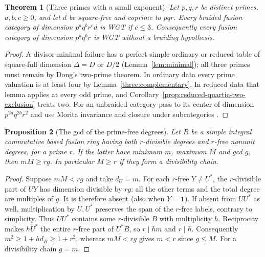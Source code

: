 \documentclass[11pt,a4paper]{article}
\numberwithin{equation}{section}
\newtheorem{theorem}{Theorem}[section]
\newtheorem{proposition}[theorem]{Proposition}
\theoremstyle{remark}
\newcommand{\one}{\mathbf1}
\begin{document}
\begin{theorem}[Three primes with a small exponent]\label{fam:M:4.12}
\label{thm:three}\label{thm:three-odd-cube-general}
Let $p,q,r$ be distinct primes, $a,b,c\ge0$, and let $d$ be
square-free and coprime to $pqr$. Every braided fusion category of
dimension $p^a q^b r^c d$ is WGT if $c\le3$. Consequently every fusion category of dimension
$p^a q^b r$ is WGT without a braiding hypothesis.
\end{theorem}
\begin{proof}
A divisor-minimal failure has a perfect simple ordinary or reduced
table of square-full dimension $\Delta=D$ or $D/2$
(Lemma~\ref{lem:minimal}); all three primes must remain by Dong's
two-prime theorem. In ordinary data every prime valuation is at least four by
Lemma~\ref{three:complementary}. In reduced data that lemma
applies at every odd prime, and Corollary~\ref{prop:reduced-quartic-two-exclusion}
treats two.
For an unbraided category pass to its center of dimension
$p^{2a}q^{2b}r^2$ and use Morita invariance and closure under
subcategories \cite[Proposition~4.1]{ENOsolvable}.
\end{proof}

\begin{proposition}[The gcd of the prime-free degrees]\label{fam:M:4.13}\label{prop:prime-free-gcd}\label{new:leak}
Let $R$ be a simple integral commutative based fusion ring having
both $r$-divisible degrees and $r$-free nonunit degrees, for a prime
$r$. If the latter have minimum $m$, maximum $M$ and gcd $g$, then
$mM\ge rg$. In particular $M\ge r$ if they form a divisibility chain.
\end{proposition}
\begin{proof}
Suppose $mM<rg$ and take $d_U=m$. For each $r$-free $Y\ne U^*$,
the $r$-divisible part of $UY$ has dimension divisible by $rg$:
all the other terms and the total degree are multiples of $g$.
It is therefore absent (also when $Y=\one$).
If absent from $UU^*$ as well, multiplication by $U,U^*$ preserves
the span of the $r$-free labels, contrary to simplicity.
Thus $UU^*$ contains some $r$-divisible $B$ with multiplicity $h$.
Reciprocity makes $hU^*$ the entire $r$-free part of $U^*B$, so
$r\mid hm$ and $r\mid h$. Consequently $m^2\ge1+hd_B\ge1+r^2$,
whereas $mM<rg$ gives $m<r$ since $g\le M$. For a divisibility
chain $g=m$.
\end{proof}
\end{document}
